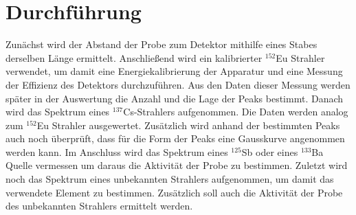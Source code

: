 
\section{Durchführung}
\label{sec:Durchführung}
Zunächst wird der Abstand der Probe zum Detektor mithilfe eines Stabes derselben Länge ermittelt. Anschließend wird ein kalibrierter $^{152}$Eu Strahler verwendet, um damit eine Energiekalibrierung der Apparatur und eine Messung der Effizienz des Detektors durchzuführen. Aus den Daten dieser Messung werden später in der Auswertung die Anzahl und die Lage der Peaks bestimmt. Danach wird das Spektrum eines $^{137}$Cs-Strahlers aufgenommen. Die Daten werden analog zum $^{152}$Eu Strahler ausgewertet. Zusätzlich wird anhand der bestimmten Peaks auch noch überprüft, dass für die Form der Peaks eine Gausskurve angenommen werden kann. Im Anschluss wird das Spektrum eines $^{125}$Sb oder eines $^{133}$Ba Quelle vermessen um daraus die Aktivität der Probe zu bestimmen. Zuletzt wird noch das Spektrum eines unbekannten Strahlers aufgenommen, um damit das verwendete Element zu bestimmen. Zusätzlich soll auch die Aktivität der Probe des unbekannten Strahlers ermittelt werden.
